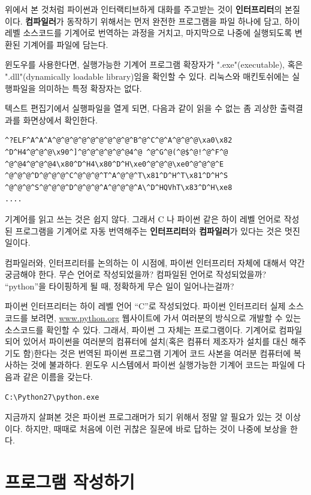 위에서 본 것처럼 파이썬과 인터랙티브하게 대화를 주고받는 것이 {\bf 인터프리터}의 본질이다. 
{\bf 컴파일러}가 동작하기 위해서는 먼저 완전한 프로그램을 파일 하나에 담고, 
하이 레벨 소스코드를 기계어로 번역하는 과정을 거치고, 마지막으로 나중에 실행되도록 변환된 기계어를 파일에 담는다.

윈도우를 사용한다면, 실행가능한 기계어 프로그램 확장자가 ".exe"(executable), 혹은 ".dll"(dynamically loadable library)임을 확인할 수 있다. 
리눅스와 매킨토쉬에는 실행파일을 의미하는 특정 확장자는 없다.

텍스트 편집기에서 실행파일을 열게 되면,
다음과 같이 읽을 수 없는 좀 괴상한 출력결과를 화면상에서 확인한다.

\beforeverb
\begin{verbatim}
^?ELF^A^A^A^@^@^@^@^@^@^@^@^@^B^@^C^@^A^@^@^@\xa0\x82
^D^H4^@^@^@\x90^]^@^@^@^@^@^@4^@ ^@^G^@(^@$^@!^@^F^@
^@^@4^@^@^@4\x80^D^H4\x80^D^H\xe0^@^@^@\xe0^@^@^@^E
^@^@^@^D^@^@^@^C^@^@^@^T^A^@^@^T\x81^D^H^T\x81^D^H^S
^@^@^@^S^@^@^@^D^@^@^@^A^@^@^@^A\^D^HQVhT\x83^D^H\xe8
....
\end{verbatim}
\afterverb
%
기계어를 읽고 쓰는 것은 쉽지 않다. 그래서 
C 나 파이썬 같은 하이 레벨 언어로 작성된 프로그램을 기계어로 자동 번역해주는 
{\bf 인터프리터}와 {\bf 컴파일러}가 있다는 것은 멋진 일이다.

컴파일러와, 인터프리터를 논의하는 이 시점에, 파이썬 인터프리터 자체에 대해서 
약간 궁금해야 한다. 무슨 언어로 작성되었을까? 컴파일된 언어로 작성되었을까?
``python''을 타이핑하게 될 때, 정확하게 무슨 일이 일어나는걸까?

파이썬 인터프리터는 하이 레벨 언어 ``C''로 작성되었다.
파이썬 인터프리터 실제 소스 코드를 보려면, 
\url{www.python.org} 웹사이트에 가서 여러분의 방식으로 개발할 수 있는 소스코드를 확인할 수 있다.
그래서, 파이썬 그 자체는 프로그램이다. 
기계어로 컴파일되어 있어서 파이썬을 여러분의 컴퓨터에 설치(혹은 컴퓨터 제조자가 설치를 대신 해주기도 함)한다는 것은 
번역된 파이썬 프로그램 기계어 코드 사본을 여러분 컴퓨터에 복사하는 것에 불과하다. 
윈도우 시스템에서 파이썬 실행가능한 기계어 코드는 파일에 다음과 같은 이름을 갖는다.

\beforeverb
\begin{verbatim}
C:\Python27\python.exe
\end{verbatim}
\afterverb
%

지금까지 살펴본 것은 파이썬 프로그래머가 되기 위해서 정말 알 필요가 있는 것 이상이다.
하지만, 때때로 처음에 이런 귀찮은 질문에 바로 답하는 것이 나중에 보상을 한다.

\section{프로그램 작성하기}


